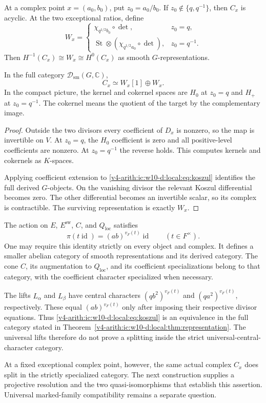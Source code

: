 \begin{proposition}\label{v4-arith:ic:w10-d:local:prop:fibers}
At a complex point $x=(a_0,b_0)$, put $z_0=a_0/b_0$.
If $z_0\notin\{q,q^{-1}\}$, then $C_x$ is acyclic.
At the two exceptional ratios, define
\[
 W_x=\begin{cases}
 \chi_{q^{1/2}b_0}\circ\det,&z_0=q,\\
 \operatorname{St}\otimes(\chi_{q^{1/2}a_0}\circ\det),&z_0=q^{-1}.
 \end{cases}
\]
Then $H^{-1}(C_x)\cong W_x\cong H^0(C_x)$ as smooth $G$-representations.

In the full category $\mathcal D_{\mathrm{sm}}(G,\mathbb C)$,
\[
 C_x\simeq W_x[1]\oplus W_x.
\]
In the compact picture, the kernel and cokernel spaces are $H_0$ at $z_0=q$
and $H_+$ at $z_0=q^{-1}$.
The cokernel means the quotient of the target by the complementary image.
\end{proposition}
\begin{proof}
Outside the two divisors every coefficient of $D_x$ is nonzero, so the map is invertible on $V$.
At $z_0=q$, the $H_0$ coefficient is zero and all positive-level coefficients are nonzero.
At $z_0=q^{-1}$ the reverse holds.
This computes kernels and cokernels as $K$-spaces.

Applying coefficient extension to \eqref{v4-arith:ic:w10-d:local:eq:koszul} identifies the full derived $G$-objects.
On the vanishing divisor the relevant Koszul differential becomes zero.
The other differential becomes an invertible scalar, so its complex is contractible.
The surviving representation is exactly $W_x$.
\end{proof}

\begin{remark}\label{v4-arith:ic:w10-d:local:rem:center}
The action on $E$, $E^\mathrm{sw}$, $C$, and $Q_{\mathrm{loc}}$ satisfies
\[
 \pi(t\operatorname{id})=(ab)^{v_F(t)}\operatorname{id}\qquad(t\in F^\times).
\]
One may require this identity strictly on every object and complex.
It defines a smaller abelian category of smooth representations and its derived category.
The cone $C$, its augmentation to $Q_{\mathrm{loc}}$, and its coefficient specializations belong to that category,
with the coefficient character specialized when necessary.

The lifts $L_\alpha$ and $L_\beta$ have central characters
$(qb^2)^{v_F(t)}$ and $(qa^2)^{v_F(t)}$, respectively.
These equal $(ab)^{v_F(t)}$ only after imposing their respective divisor equations.
Thus \eqref{v4-arith:ic:w10-d:local:eq:koszul} is an equivalence in the full category stated in Theorem~\ref{v4-arith:ic:w10-d:local:thm:representation}.
The universal lifts therefore do not prove a splitting inside the
strict universal-central-character category.

At a fixed exceptional
complex point, however, the same actual complex $C_x$ does split in
the strictly specialized category. The next construction supplies a
projective resolution and the two quasi-isomorphisms that establish
this assertion. Universal marked-family compatibility remains a
separate question.
\end{remark}

